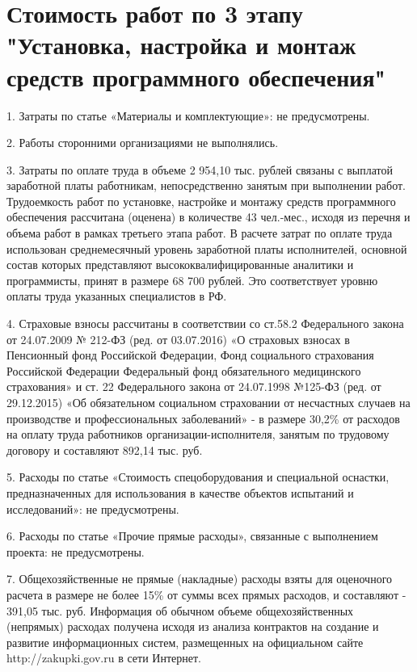 \section*{Стоимость работ по 3 этапу "Установка, настройка и монтаж средств программного обеспечения"}

1.	Затраты по статье «Материалы и комплектующие»:	не предусмотрены.

2. Работы сторонними организациями не выполнялись.

3. Затраты по оплате труда в объеме 2 954,10 тыс. рублей связаны с выплатой заработной платы работникам, непосредственно занятым при выполнении работ. Трудоемкость работ по установке, настройке и монтажу средств программного обеспечения рассчитана (оценена) в количестве 43 чел.-мес., исходя из перечня и объема работ в рамках третьего этапа работ. В расчете затрат по оплате труда использован среднемесячный уровень заработной платы исполнителей, основной состав которых представляют высококвалифицированные аналитики и программисты, принят в размере 68 700 рублей. Это соответствует уровню оплаты труда указанных специалистов в РФ.

4. Страховые взносы рассчитаны в соответствии со ст.58.2 Федерального закона от 24.07.2009 № 212-ФЗ (ред. от 03.07.2016) «О страховых взносах в Пенсионный фонд Российской Федерации, Фонд социального страхования Российской Федерации Федеральный фонд обязательного медицинского страхования» и ст. 22 Федерального закона от 24.07.1998 №125-ФЗ (ред. от 29.12.2015)	«Об обязательном социальном страховании от несчастных случаев на производстве и профессиональных заболеваний» - в размере 30,2\% от расходов на оплату труда работников организации-исполнителя, занятым по трудовому договору и составляют 892,14 тыс. руб.

5.	Расходы по статье «Стоимость спецоборудования и специальной оснастки, предназначенных для использования в качестве объектов испытаний и исследований»: не предусмотрены.

6.	Расходы по статье «Прочие прямые расходы», связанные с выполнением проекта: не предусмотрены.

7.	Общехозяйственные не прямые (накладные) расходы взяты для оценочного расчета в размере не более 15\% от суммы всех прямых расходов, и составляют - 391,05 тыс. руб. Информация об обычном объеме общехозяйственных (непрямых) расходах получена исходя из анализа контрактов на создание и развитие информационных систем, размещенных на официальном сайте http://zakupki.gov.ru в сети Интернет.


